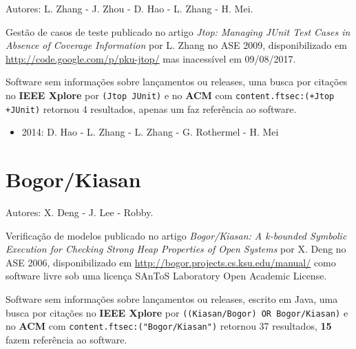 Autores:
L. Zhang - J. Zhou - D. Hao - L. Zhang - H. Mei.

Gestão de casos de teste
publicado no artigo {\it Jtop: Managing JUnit Test Cases in Absence of Coverage Information}
por L. Zhang
no ASE 2009,
disponibilizado em \url{http://code.google.com/p/pku-jtop/}
mas inacessível em 09/08/2017.

Software sem informações sobre lançamentos ou releases,
uma busca por citações no {\bf IEEE Xplore} por
\texttt{(Jtop JUnit)}
e no {\bf ACM} com
\texttt{content.ftsec:(+Jtop +JUnit)}
retornou
4 resultados,
apenas um faz referência ao software.

\begin{itemize}
\item 2014: D. Hao - L. Zhang - L. Zhang - G. Rothermel - H. Mei
\end{itemize}

\section{Bogor/Kiasan}

Autores:
X. Deng - J. Lee - Robby.

Verificação de modelos
publicado no artigo {\it Bogor/Kiasan: A k-bounded Symbolic Execution for Checking Strong Heap Properties of Open Systems}
por X. Deng
no ASE 2006,
disponibilizado em \url{http://bogor.projects.cs.ksu.edu/manual/}
como software livre
sob uma licença SAnToS Laboratory Open Academic License.

Software sem informações sobre lançamentos ou releases,
escrito em Java,
uma busca por citações no {\bf IEEE Xplore} por
\texttt{((Kiasan/Bogor) OR Bogor/Kiasan)}
e no {\bf ACM} com
\texttt{content.ftsec:("Bogor/Kiasan")}
retornou
37 resultados,
{\bf 15} fazem referência ao software.

